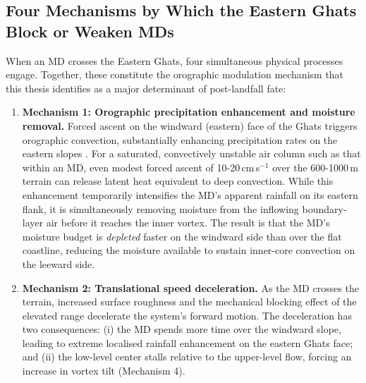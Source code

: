 \subsection{Four Mechanisms by Which the Eastern Ghats Block or Weaken MDs}
\label{subsec:ghats_mechanisms}

When an MD crosses the Eastern Ghats, four simultaneous physical
processes engage.
Together, these constitute the orographic modulation mechanism that
this thesis identifies as a major determinant of post-landfall fate:

\begin{enumerate}
  \item \textbf{Mechanism 1: Orographic precipitation enhancement and
    moisture removal.} Forced ascent on the windward (eastern)
    face of the Ghats  triggers orographic convection, substantially
    enhancing precipitation rates on the eastern slopes
    \citep{houze1994, orographyconvection2005, medina2003analysis}.
    For a saturated, convectively unstable air column such as that
    within an MD, even modest forced ascent of 10-20\,cm\,s$^{-1}$
    over the 600-1000\,m terrain can release latent heat equivalent
    to deep convection. While this enhancement temporarily
    intensifies the MD's apparent rainfall on its eastern flank, it
    is simultaneously removing moisture from the inflowing
    boundary-layer air before it reaches the inner vortex. The result
    is that the MD's moisture budget is \emph{depleted} faster on the
    windward side than over the flat coastline, reducing the moisture
    available to sustain inner-core convection on the leeward side.
  \item \textbf{Mechanism 2: Translational speed deceleration.} As
    the MD crosses the terrain, increased surface roughness and the
    mechanical blocking effect of the elevated range decelerate the
    system's forward motion.
    The deceleration has two consequences: (i) the MD spends more
    time over the windward slope, leading to extreme localised
    rainfall enhancement on the eastern Ghats face; and (ii) the
    low-level center stalls relative to the upper-level flow, forcing
    an increase in vortex tilt (Mechanism 4).

\end{enumerate}
